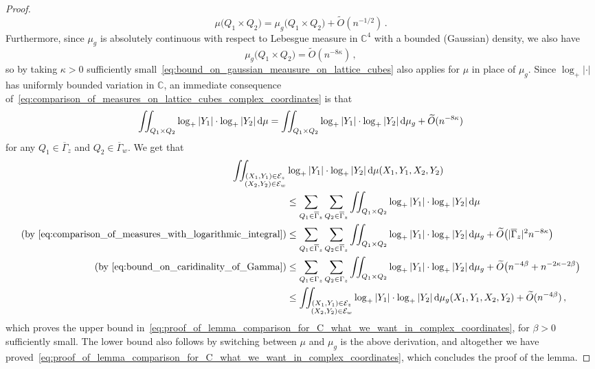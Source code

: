 \documentclass[11pt]{amsart}
\theoremstyle{remark}
\theoremstyle{definition}
\def\Ga{{\Gamma}}
\newcommand{\bC}{\mathbb C}
\newcommand{\cE}{\mathcal{E}}
\begin{document}
\begin{proof}
        \begin{equation}
        \label{eq:comparison_of_measures_on_lattice_cubes_complex_coordinates}
            \mu\big(Q_1\times Q_2\big) = \mu_g\big(Q_1\times Q_2\big) + \widetilde{O}(n^{-1/2}) \, .
        \end{equation}
        Furthermore, since $\mu_g$ is absolutely continuous with respect to Lebesgue measure in $\bC^4$ with a bounded (Gaussian) density, we also have
        \begin{equation}
        \label{eq:bound_on_gaussian_meausure_on_lattice_cubes}
           \mu_g\big(Q_1\times Q_2\big) = \widetilde{O}(n^{-8\kappa}) \, , 
        \end{equation}
        so by taking $\kappa>0$ sufficiently small~\eqref{eq:bound_on_gaussian_meausure_on_lattice_cubes} also applies for $\mu$ in place of $\mu_g$. Since $\log_+|\cdot|$ has uniformly bounded variation in $\bC$, an immediate consequence of~\eqref{eq:comparison_of_measures_on_lattice_cubes_complex_coordinates} is that 
        \begin{equation}
        \label{eq:comparison_of_measures_with_logarithmic_integral}
            \iint_{Q_1\times Q_2} \log_+|Y_1| \cdot \log_+|Y_2| \, {\rm d}\mu \\ = \iint_{Q_1\times Q_2} \log_+|Y_1| \cdot \log_+|Y_2| \, {\rm d}\mu_g + \widetilde{O}(n^{-8\kappa})
        \end{equation}
        for any $Q_1\in \overline{\Ga}_z$ and $Q_2\in \overline{\Ga}_w$. We get that
        \begin{align*}
            \iint_{\substack{  (X_1,Y_1)\in \cE_z \\  (X_2,Y_2)\in \cE_w }} & \log_+|Y_1| \cdot \log_+|Y_2| \, {\rm d}\mu(X_1,Y_1,X_2,Y_2) \\ & \le \sum_{Q_1\in \overline{\Ga}_z} \sum_{Q_2\in \overline{\Ga}_z} \iint_{Q_1\times Q_2} \log_+|Y_1| \cdot \log_+|Y_2| \, {\rm d}\mu \\ (\text{by}~\eqref{eq:comparison_of_measures_with_logarithmic_integral}) &\le \sum_{Q_1\in \overline{\Ga}_z} \sum_{Q_2\in \overline{\Ga}_z} \iint_{Q_1\times Q_2} \log_+|Y_1| \cdot \log_+|Y_2| \, {\rm d}\mu_g + \widetilde{O}\big(|\overline{\Ga}_z|^2 n^{-8\kappa}\big) 
            \\ (\text{by}~\eqref{eq:bound_on_caridinality_of_Gamma}) & \le \sum_{Q_1\in \Ga_z} \sum_{Q_2\in \Ga_z} \iint_{Q_1\times Q_2} \log_+|Y_1| \cdot \log_+|Y_2| \, {\rm d}\mu_g + \widetilde{O}\big(n^{-4\beta} + n^{-2\kappa -2\beta} \big) 
            \\ & \le 
            \iint_{\substack{  (X_1,Y_1)\in \cE_z \\  (X_2,Y_2)\in \cE_w }} \log_+|Y_1| \cdot \log_+|Y_2| \, {\rm d}\mu_g(X_1,Y_1,X_2,Y_2)  + \widetilde{O}(n^{-4\beta}) \, , 
        \end{align*}
        which proves the upper bound in~\eqref{eq:proof_of_lemma_comparison_for_C_what_we_want_in_complex_coordinates}, for $\beta>0$ sufficiently small. The lower bound also follows by switching between $\mu$ and $\mu_g$ is the above derivation, and altogether we have proved~\eqref{eq:proof_of_lemma_comparison_for_C_what_we_want_in_complex_coordinates}, which concludes the proof of the lemma.
    \end{proof}
\end{document}
